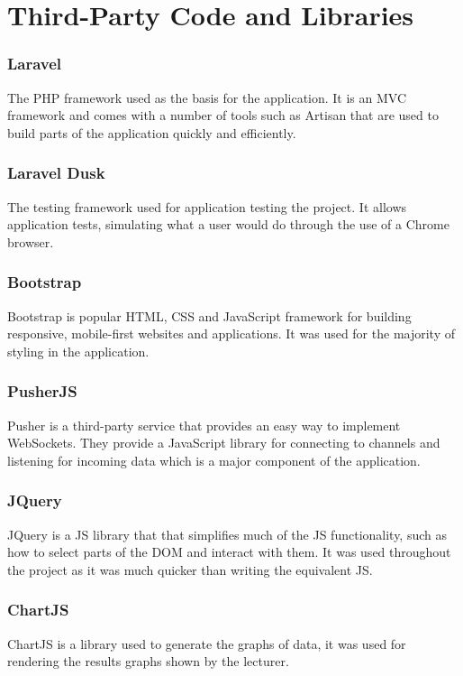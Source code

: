 \chapter{Third-Party Code and Libraries}
\subsection{Laravel}
The PHP framework used as the basis for the application\cite{laravel}. It is an MVC framework and comes with a number of tools such as Artisan\cite{artisan} that are used to build parts of the application quickly and efficiently.
\subsection{Laravel Dusk}
The testing framework used for application testing the project\cite{dusk}. It allows application tests, simulating what a user would do through the use of a Chrome browser.
\subsection{Bootstrap}
Bootstrap is popular HTML, CSS and JavaScript framework for building responsive, mobile-first websites and applications\cite{bootstrap}. It was used for the majority of styling in the application.
\subsection{PusherJS}
Pusher is a third-party service that provides an easy way to implement WebSockets\cite{pusher-what-is}. They provide a JavaScript library for connecting to channels and listening for incoming data which is a major component of the application.
\subsection{JQuery}
JQuery is a JS library that that simplifies much of the JS functionality, such as how to select parts of the DOM and interact with them\cite{jquery}. It was used throughout the project as it was much quicker than writing the equivalent JS.
\subsection{ChartJS}
ChartJS is a library used to generate the graphs of data, it was used for rendering the results graphs shown by the lecturer\cite{chartjs}.